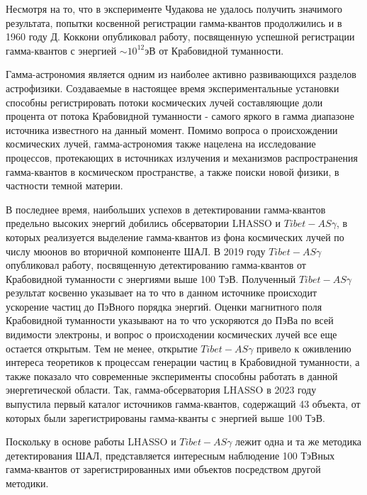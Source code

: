 Несмотря на то, что в эксперименте Чудакова не удалось получить значимого результата, попытки косвенной регистрации гамма-квантов продолжились и в 1960 году Д. Коккони опубликовал работу, посвященную успешной регистрации гамма-квантов с энергией $\sim10^{12}$эВ от Крабовидной туманности. 

Гамма-астрономия является одним из наиболее активно развивающихся разделов астрофизики. Создаваемые в настоящее время экспериментальные установки способны регистрировать потоки космических лучей составляющие доли процента от потока Крабовидной туманности - самого яркого в гамма диапазоне источника известного на данный момент. Помимо вопроса о происхождении космических лучей, гамма-астрономия также нацелена на исследование процессов, протекающих в источниках излучения и механизмов распространения гамма-квантов в космическом пространстве, а также поиски новой физики, в частности темной материи.

В последнее время, наибольших успехов в детектировании гамма-квантов предельно высоких энергий добились обсерватории LHASSO и $Tibet-AS\gamma$, в которых реализуется выделение гамма-квантов из фона космических лучей по числу мюонов во вторичной компоненте ШАЛ. В 2019 году $Tibet-AS\gamma$ опубликовал работу, посвященную детектированию гамма-квантов от Крабовидной туманности с энергиями выше 100 ТэВ\cite{Tibet2019}.  Полученный $Tibet-AS\gamma$ результат косвенно указывает на то что в данном источнике происходит ускорение частиц до ПэВного порядка энергий. Оценки магнитного поля Крабовидной туманности указывают на то что ускоряются до ПэВа по всей видимости электроны, и вопрос о происходении космических лучей все еще остается открытым. Тем не менее, открытие $Tibet-AS\gamma$ привело к оживлению интереса теоретиков к процессам генерации частиц в Крабовидной туманности, а также показало что современные эксперименты способны работать в данной энергетической области. Так, гамма-обсерватория LHASSO в 2023 году выпустила первый каталог источников гамма-квантов, содержащий 43 объекта, от которых были зарегистрированы гамма-кванты с энергией выше 100 ТэВ\cite{Lhaaso_cat2023}.

Поскольку в основе работы LHASSO и $Tibet-AS\gamma$ лежит одна и та же методика детектирования ШАЛ, представляется интересным наблюдение 100 ТэВных гамма-квантов от зарегистрированных ими объектов посредством другой методики.   


